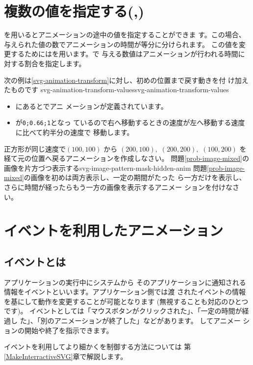 \section{複数の値を指定する(,)}
を用いるとアニメーションの途中の値を指定することができま
す。この場合、与えられた値の数でアニメーションの時間が等分に分けられます。
この値を変更するためにはを用います。で
与える数値はアニメーションが行われる時間に対する割合を指定します。

次の例は\ref{svg-animation-transform}に対し、初めの位置まで戻す動きを付
け加えたものです%
{}
{svg-animation-transform-values}{svg-animation-transform-values}
\begin{itemize}
 \item {}にあるとでアニ
メーションが定義されています。
 \item {}が\texttt{0;0.66;1}となっ
ているので右へ移動するときの速度が左へ移動する速度に比べて約半分の速度で
移動します。
\end{itemize}
{ 正方形が同じ速度で$(100,100)$ から $(200,100),$ $(200,200),$
$(100,200)$ を経て元の位置へ戻るアニメーションを作成しなさい。}
{問題\ref{prob-image-mixed}の画像を片方づつ表示する}{svg-image-pattern-mask-hidden-anim}
{ 問題\ref{prob-image-mixed}の画像を初めは両方表示し、一定の期間がたった
ら一方だけを表示し、さらに時間が経ったらもう一方の画像を表示するアニメー
ションを付けなさい。}
\section{イベントを利用したアニメーション}
\subsection{イベントとは}
アプリケーションの実行中にシステムから
そのアプリケーションに通知される情報をイベントといいます。アプリケーション側では渡
されたイベントの情報を基にして動作を変更することが可能となります
(無視することも対応のひとつです)。
イベントとしては「マウスボタンがクリックされた」、「一定の時間が経過し
た」、「別のアニメーションが終了した」などがあります。
%
してアニメー
ションの開始や終了を指示できます。
\iffalse
イベントとしては次のようなものがあります。
\begin{itemize}
 \item マウスボタンがクリックされた。
 \item 一定の時間が経過した。
 \item 別のアニメーションが終了した。
\end{itemize}
\fi
イベントを利用してより細かく\SVG を制御する方法については
第\ref{MakeInterractiveSVG}章で解説します。

